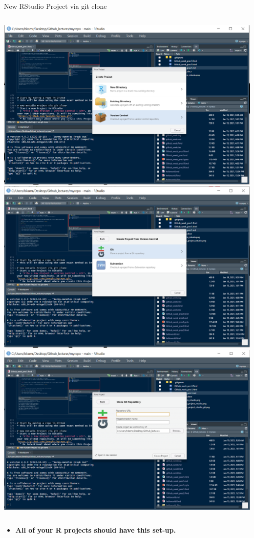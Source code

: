 \documentclass[
  ignorenonframetext,
]{beamer}
\providecommand{\tightlist}{%
  \setlength{\itemsep}{0pt}\setlength{\parskip}{0pt}}
\begin{document}
\begin{frame}[fragile]{New RStudio Project via git clone}
\begin{columns}[T]
\begin{column}{0.48\textwidth}
\includegraphics{pres_figs/new_project_rstudio.png}
\includegraphics{pres_figs/new_project_rstudio_git.png}
\includegraphics{pres_figs/new_project_rstudio_git_url.png}
\end{column}
\end{columns}

\begin{itemize}
\tightlist
\item
  \textbf{All of your R projects should have this set-up.}
\end{itemize}

\end{frame}
\end{document}
